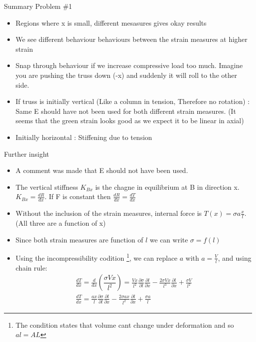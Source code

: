 	\begin{frame}{Summary Problem \#1}
		\begin{itemize}
			\item Regions where x is small, different mesasures gives okay results
			\item We see different behaviour behaviours between the strain measures at higher strain
			\item Snap through behaviour if we increase compressive load too much. Imagine you are pushing the truss down (-x) and suddenly it will roll to the other side. 
			\item If truss  is initially vertical  (Like a column in tension, Therefore no rotation) : Same E should have not been used for both different strain measures. (It seems that the green strain looks good as we expect it to be linear in axial)
			\item Initially horizontal : Stiffening due to tension
			
		\end{itemize}
	\end{frame}

	\begin{frame}{Further insight}
	\begin{itemize}
		\item A comment was made that E should not have been used. 
		\item The vertical stiffness $K_{Bx}$ is the chagne in equilibrium at B in direction x. $K_{Bx} =  \frac{dR}{dx}$. If F is constant then $\frac{dR}{dx} =  \frac{dT}{dx}$
		\item Without the inclusion of the strain measures, internal force is $T(x) = \sigma a \frac{ x}{l} $. (All three are a function of x)
		\item Since both strain measures are function of $l$ we can write $\sigma = f(l)$
		\item Using the incompressibility codition \footnote{The condition states that volume cant change under deformation and so $al = AL$}, we can replace $a$ with $a =  \frac{V}{l}$, and using chain rule:
		\begin{align*}
			 \frac{dT}{dx} = \frac{d}{dx}\left(\dfrac{\sigma V x}{l^2} \right)=\frac{Vx}{l^2}\frac{\partial \sigma}{\partial l} \frac{\partial l}{\partial x} -\frac{2\sigma Vx}{l^3}\frac{\partial l}{\partial x } + \frac{\sigma V}{l^2} \\
			  \frac{dT}{dx} = \frac{ax}{l}\frac{\partial \sigma}{\partial l} \frac{\partial l}{\partial x} -\frac{2\sigma ax}{l^2}\frac{\partial l}{\partial x } + \frac{\sigma a}{l}
		\end{align*}
	\end{itemize}
	\end{frame}

